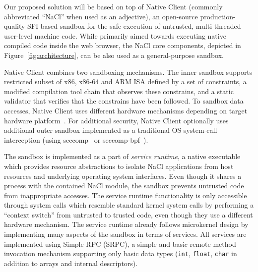 Our proposed solution will be based on top of Native Client (commonly
abbreviated ``NaCl'' when used as an adjective), an open-source
production-quality SFI-based sandbox for the safe execution of
untrusted, multi-threaded user-level machine code. While primarily aimed
towards executing native compiled code inside the web browser, the NaCl
core components, depicted in Figure~\ref{fig:architecture}, can be also
used as a general-purpose sandbox.


Native Client combines two sandboxing mechanisms. The inner sandbox
supports restricted subset of x86, x86-64 and ARM ISA defined by a set
of constraints, a modified compilation tool chain that observes these
constrains, and a static validator that verifies that the constrains
have been followed. To sandbox data accesses, Native Client uses
different hardware mechanisms depending on target hardware
platform~\cite{yee:ieee-sp09,sehr:usenix-sec10}. For additional
security, Native Client optionally uses additional outer sandbox
implemented as a traditional OS system-call interception (\eg using
seccomp~\cite{seccomp:linux} or
seccomp\mbox{-}bpf~\cite{seccomp-bpf:linux}).

The sandbox is implemented as a part of \emph{service runtime}, a native
executable which provides resource abstractions to isolate NaCl
applications from host resources and underlying operating system
interfaces. Even though it shares a process with the contained NaCl
module, the sandbox prevents untrusted code from inappropriate accesses.
The service runtime functionality is only accessible through system
calls which resemble standard kernel system calls by performing a
``context switch'' from untrusted to trusted code, even though they use
a different hardware mechanism. The service runtime already follows
microkernel design by implementing many aspects of the sandbox in terms
of services. All services are implemented using Simple RPC (SRPC), a
simple and basic remote method invocation mechanism supporting only
basic data types (\ie \lstinline`int`, \lstinline`float`,
\lstinline`char` in addition to arrays and internal descriptors).



